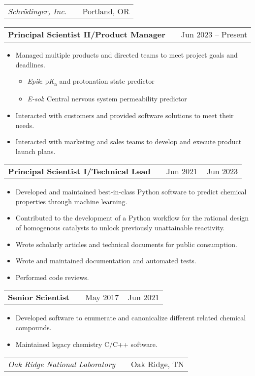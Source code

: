 \documentclass[a4paper,12pt]{article}
\makeatletter
\newenvironment{joblocation}[2]
    {
    \begin{tabularx}{\linewidth}{@{}l X r@{}}
    \textit{#1} & \hfill &  #2 \\[3.75pt]
    \end{tabularx}
    }
    {
    }
\newenvironment{jobtitle}[2]
    {
    \vspace{4pt}
    \begin{tabularx}{\linewidth}{@{}l X r@{}}
    \textbf{#1} & \hfill &  #2 \\[3.75pt]
    \end{tabularx}
    \begin{minipage}[t]{\linewidth}
    \begin{itemize}[nosep, after=\strut, leftmargin=1em, itemsep=3pt, label=--]
    }
    {
    \end{itemize}
    \vspace{8pt}
    \end{minipage}
    }
\makeatother
\begin{document}
\begin{joblocation}{Schr\"odinger, Inc.}{Portland, OR}
\end{joblocation}
\begin{jobtitle}{Principal Scientist II/Product Manager}{Jun 2023 -- Present}
    \item Managed multiple products and directed teams to meet project goals and deadlines.
    \vspace{2pt}
    \begin{itemize}
        \item \textit{Epik}: p\textit{K}\textsubscript{a} and protonation state predictor
        \item \textit{E-sol}: Central nervous system permeability predictor
    \end{itemize}
    \item Interacted with customers and provided software solutions to meet their needs.
    \item Interacted with marketing and sales teams to develop and execute product launch plans.
\end{jobtitle}
\begin{jobtitle}{Principal Scientist I/Technical Lead}{Jun 2021 -- Jun 2023}
    \item Developed and maintained best-in-class Python software to predict chemical properties through machine learning.
    \item Contributed to the development of a Python workflow for the rational design of homogenous catalysts to unlock previously unattainable reactivity.
    \item Wrote scholarly articles and technical documents for public consumption.
    \item Wrote and maintained documentation and automated tests.
    \item Performed code reviews.
\end{jobtitle}
\begin{jobtitle}{Senior Scientist}{May 2017 -- Jun 2021}
    \item Developed software to enumerate and canonicalize different related chemical compounds.
    \item Maintained legacy chemistry C/C++ software.
\end{jobtitle}
\begin{joblocation}{Oak Ridge National Laboratory}{Oak Ridge, TN}
\end{joblocation}
\end{document}
